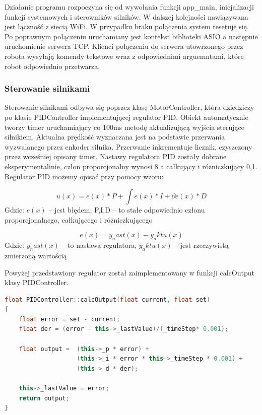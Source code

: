 Działanie programu rozpoczyna się od wywołania funkcji app\_main, inicjalizacji funkcji systemowych i sterowników silników.
W dalszej kolejności nawiązywana jest łączność z siecią WiFi. W przypadku braku połączenia system resetuje się. 
Po poprawnym połączeniu uruchamiany jest kontekst biblioteki ASIO a następnie uruchomienie serwera TCP.
Klienci połączeniu do serwera utowrzonego przez robota wysyłają komendy tekstowe wraz z odpowiednimi arguemntami, które
robot odpowiednio przetwarza. 

\subsubsection{Sterowanie silnikami}
Sterowanie silnikami odbywa się poprzez klasę MotorController, która dziedziczy po klasie PIDController implementującej regulator PID.
Obiekt automatycznie tworzy timer uruchamiający co 100ms metodę aktualizującą wyjścia sterujące silnikiem. 
Aktualna prędkość wyznaczana jest na podstawie przerwania wyzwalanego przez enkoder silnika. Przerwanie inkrementuje licznik, 
czyszczony przez wcześniej opisany timer. Nastawy regulatora PID zostały dobrane eksperymentalinie, człon proporcjonalny wynosi 8 a całkujący i różniczkujący 0,1. 
Regulator PID możemy opisać przy pomocy wzoru:

\begin{equation}
	u(x) = e(x) * P + \int{e(x)} * I + \partial{e(x)} * D 
	\label{Eq:PID}
\end{equation}
Gdzie: $e(x)$ -- jest błędem; P,I,D -- to stałe odpowiednio członu proporcjonalnego, całkującego i różniczkującego

\begin{equation}
	e(x) = y_nast(x) - y_aktu(x)
	\label{Eq:blad}
\end{equation}
Gdzie: $y_nast(x)$ -- to nastawa regulatora, $y_aktu(x)$ -- jest rzeczywistą zmierzoną wartością
 
Powyżej przedstawiony regulator został zaimplementowany w funkcji calcOutput klasy PIDController.

\begin{lstlisting}[language=C++,caption=Zaimplementowany w C++ regulator PID,label={kodCPPPIDOutput}]
float PIDController::calcOutput(float current, float set)
{
	float error = set - current;
	float der = (error - this->_lastValue)/(_timeStep* 0.001);
	
	float output =  (this->_p * error) + 
					(this->_i * error * this->_timeStep * 0.001) + 
					(this->_d * der);

	this->_lastValue = error;
	return output;
}
\end{lstlisting}

